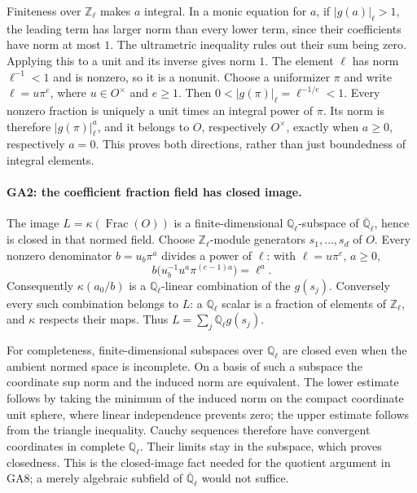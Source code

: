 Finiteness over $\mathbb Z_\ell$ makes $a$ integral. In a monic
equation for $a$, if $|g(a)|_\ell>1$, the leading term has larger
norm than every lower term, since their coefficients have norm at
most $1$. The ultrametric inequality rules out their sum being zero.
Applying this to a unit and its inverse gives norm $1$.
The element $\ell$ has norm $\ell^{-1}<1$ and is nonzero, so it is
a nonunit. Choose a uniformizer $\pi$ and write
$\ell=u\pi^e$, where $u\in O^\times$ and $e\geq1$.
Then
$0<|g(\pi)|_\ell=\ell^{-1/e}<1$.
Every nonzero fraction is uniquely a unit times an integral power of
$\pi$. Its norm is therefore $|g(\pi)|_\ell^a$, and it belongs to
$O$, respectively $O^\times$, exactly when $a\geq0$,
respectively $a=0$. This proves both directions, rather than just
boundedness of integral elements.

\paragraph{GA2: the coefficient fraction field has closed image.}
The image $L=\kappa(\operatorname{Frac}(O))$ is a finite-dimensional
$\mathbb Q_\ell$-subspace of $\overline{\mathbb Q}_\ell$, hence is
closed in that normed field.
Choose $\mathbb Z_\ell$-module generators $s_1,\ldots,s_d$ of $O$.
Every nonzero denominator $b=u_b\pi^a$ divides a power of $\ell$:
with $\ell=u\pi^e$, $a\geq0$,
\[
 b\bigl(u_b^{-1}u^a\pi^{(e-1)a}\bigr)=\ell^a.
\]
Consequently $\kappa(a_0/b)$ is a $\mathbb Q_\ell$-linear combination
of the $g(s_j)$. Conversely every such combination belongs to $L$:
a $\mathbb Q_\ell$ scalar is a fraction of elements of
$\mathbb Z_\ell$, and $\kappa$ respects their maps. Thus
$L=\sum_j\mathbb Q_\ell g(s_j)$.

For completeness, finite-dimensional subspaces over
$\mathbb Q_\ell$ are closed even when the ambient normed space is
incomplete. On a basis of such a subspace the coordinate sup norm
and the induced norm are equivalent. The lower estimate follows
by taking the minimum of the induced norm on the compact coordinate
unit sphere, where linear independence prevents zero; the upper
estimate follows from the triangle inequality. Cauchy sequences
therefore have convergent coordinates in complete $\mathbb Q_\ell$.
Their limits stay in the subspace, which proves closedness.
This is the closed-image fact needed for the quotient argument in
GA8; a merely algebraic subfield of
$\overline{\mathbb Q}_\ell$ would not suffice.

